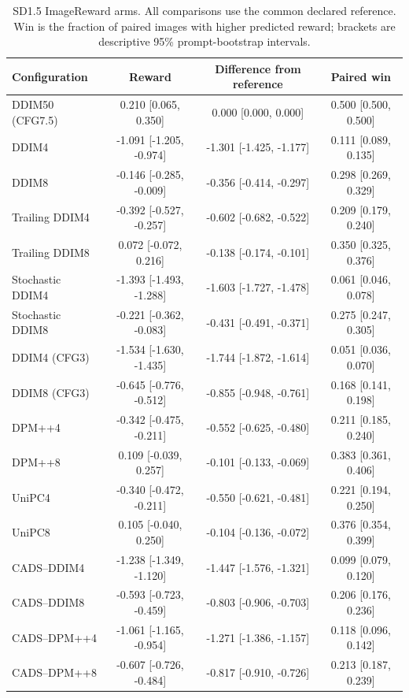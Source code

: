 \begin{table}[t]\centering\small
\caption{SD1.5 ImageReward arms. All comparisons use the common declared reference. Win is the fraction of paired images with higher predicted reward; brackets are descriptive 95\% prompt-bootstrap intervals.}
\begin{tabular}{lccc}\toprule
Configuration & Reward & Difference from reference & Paired win \\\midrule
DDIM50 (CFG7.5) & 0.210 [0.065, 0.350] & 0.000 [0.000, 0.000] & 0.500 [0.500, 0.500] \\
DDIM4 & -1.091 [-1.205, -0.974] & -1.301 [-1.425, -1.177] & 0.111 [0.089, 0.135] \\
DDIM8 & -0.146 [-0.285, -0.009] & -0.356 [-0.414, -0.297] & 0.298 [0.269, 0.329] \\
Trailing DDIM4 & -0.392 [-0.527, -0.257] & -0.602 [-0.682, -0.522] & 0.209 [0.179, 0.240] \\
Trailing DDIM8 & 0.072 [-0.072, 0.216] & -0.138 [-0.174, -0.101] & 0.350 [0.325, 0.376] \\
Stochastic DDIM4 & -1.393 [-1.493, -1.288] & -1.603 [-1.727, -1.478] & 0.061 [0.046, 0.078] \\
Stochastic DDIM8 & -0.221 [-0.362, -0.083] & -0.431 [-0.491, -0.371] & 0.275 [0.247, 0.305] \\
DDIM4 (CFG3) & -1.534 [-1.630, -1.435] & -1.744 [-1.872, -1.614] & 0.051 [0.036, 0.070] \\
DDIM8 (CFG3) & -0.645 [-0.776, -0.512] & -0.855 [-0.948, -0.761] & 0.168 [0.141, 0.198] \\
DPM++4 & -0.342 [-0.475, -0.211] & -0.552 [-0.625, -0.480] & 0.211 [0.185, 0.240] \\
DPM++8 & 0.109 [-0.039, 0.257] & -0.101 [-0.133, -0.069] & 0.383 [0.361, 0.406] \\
UniPC4 & -0.340 [-0.472, -0.211] & -0.550 [-0.621, -0.481] & 0.221 [0.194, 0.250] \\
UniPC8 & 0.105 [-0.040, 0.250] & -0.104 [-0.136, -0.072] & 0.376 [0.354, 0.399] \\
CADS--DDIM4 & -1.238 [-1.349, -1.120] & -1.447 [-1.576, -1.321] & 0.099 [0.079, 0.120] \\
CADS--DDIM8 & -0.593 [-0.723, -0.459] & -0.803 [-0.906, -0.703] & 0.206 [0.176, 0.236] \\
CADS--DPM++4 & -1.061 [-1.165, -0.954] & -1.271 [-1.386, -1.157] & 0.118 [0.096, 0.142] \\
CADS--DPM++8 & -0.607 [-0.726, -0.484] & -0.817 [-0.910, -0.726] & 0.213 [0.187, 0.239] \\

\end{tabular}
\end{table}
